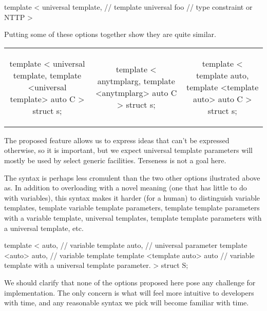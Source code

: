 \documentclass{wg21}
\begin{document}
\begin{colorblock}
template <
        universal template, // template
        universal foo       // type constraint or NTTP
>
\end{colorblock}

Putting some of these options together show they are quite similar.

\begin{table}
\tiny
\hspace{-30pt}
\begin{tabular}{c | c | c}
\begin{colorblock}
template <
  universal template,
  template <universal template> auto C
>
struct s;
\end{colorblock}
&
\begin{colorblock}
template <
  anytmplarg,
  template <anytmplarg> auto C
>
struct s;
\end{colorblock}
&
\begin{colorblock}
template <
  template auto,
  template <template auto> auto C
>
struct s;
\end{colorblock}
\end{tabular}
\end{table}


The proposed feature allows us to express ideas that can't be expressed otherwise, so it is important,
but we expect universal template parameters will mostly be used by select generic facilities. Terseness is not a goal here.

The  syntax is perhaps less cromulent than the two other options ilustrated above as. In addition to overloading
 with a novel meaning (one that has little to do with variables), this syntax makes it harder (for a human) to distinguish
variable templates, template variable template parameters, template template parameters with a variable template, universal templates,
template template parameters with a universal template, etc.

\begin{colorblock}
template <
   auto, // variable
   template auto, // universal parameter
   template <auto> auto, // variable template
   template <template auto> auto // variable template with a universal template parameter.
>
struct S;
\end{colorblock}


We should clarify that none of the options proposed here pose any challenge for implementation. The only concern is what will feel more intuitive to
developers with time, and any reasonable syntax we pick will become familiar with time.
\end{document}
